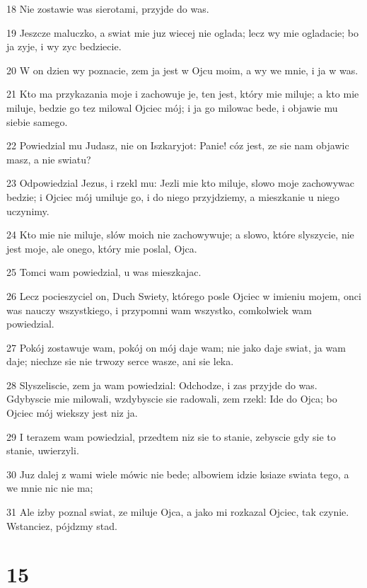 \par 18 Nie zostawie was sierotami, przyjde do was.
\par 19 Jeszcze maluczko, a swiat mie juz wiecej nie oglada; lecz wy mie ogladacie; bo ja zyje, i wy zyc bedziecie.
\par 20 W on dzien wy poznacie, zem ja jest w Ojcu moim, a wy we mnie, i ja w was.
\par 21 Kto ma przykazania moje i zachowuje je, ten jest, który mie miluje; a kto mie miluje, bedzie go tez milowal Ojciec mój; i ja go milowac bede, i objawie mu siebie samego.
\par 22 Powiedzial mu Judasz, nie on Iszkaryjot: Panie! cóz jest, ze sie nam objawic masz, a nie swiatu?
\par 23 Odpowiedzial Jezus, i rzekl mu: Jezli mie kto miluje, slowo moje zachowywac bedzie; i Ojciec mój umiluje go, i do niego przyjdziemy, a mieszkanie u niego uczynimy.
\par 24 Kto mie nie miluje, slów moich nie zachowywuje; a slowo, które slyszycie, nie jest moje, ale onego, który mie poslal, Ojca.
\par 25 Tomci wam powiedzial, u was mieszkajac.
\par 26 Lecz pocieszyciel on, Duch Swiety, którego posle Ojciec w imieniu mojem, onci was nauczy wszystkiego, i przypomni wam wszystko, comkolwiek wam powiedzial.
\par 27 Pokój zostawuje wam, pokój on mój daje wam; nie jako daje swiat, ja wam daje; niechze sie nie trwozy serce wasze, ani sie leka.
\par 28 Slyszeliscie, zem ja wam powiedzial: Odchodze, i zas przyjde do was. Gdybyscie mie milowali, wzdybyscie sie radowali, zem rzekl: Ide do Ojca; bo Ojciec mój wiekszy jest niz ja.
\par 29 I terazem wam powiedzial, przedtem niz sie to stanie, zebyscie gdy sie to stanie, uwierzyli.
\par 30 Juz dalej z wami wiele mówic nie bede; albowiem idzie ksiaze swiata tego, a we mnie nic nie ma;
\par 31 Ale izby poznal swiat, ze miluje Ojca, a jako mi rozkazal Ojciec, tak czynie. Wstanciez, pójdzmy stad.

\chapter{15}

